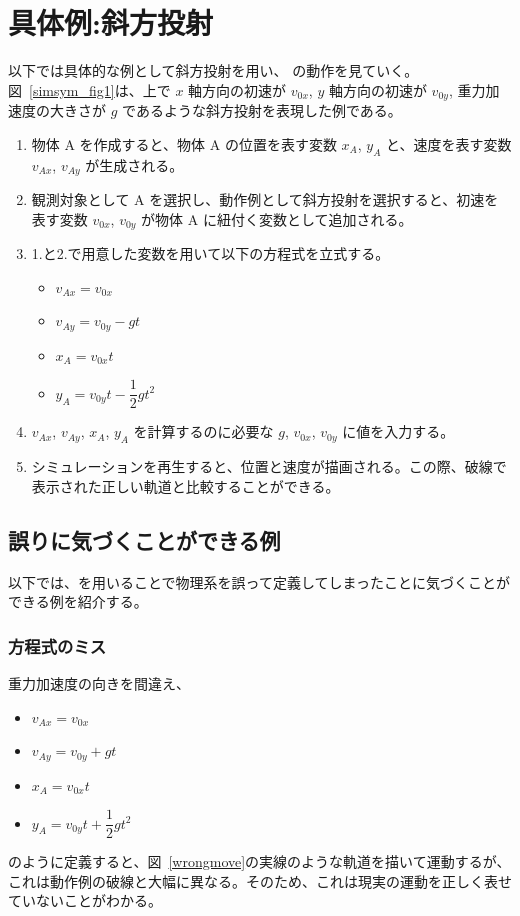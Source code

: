\section{具体例:斜方投射}
以下では具体的な例として斜方投射を用い、 \simname の動作を見ていく。
図~\ref{simsym_fig1}は、\simname 上で $x$ 軸方向の初速が $v_{0x}$, $y$ 軸方向の初速が $v_{0y}$, 重力加速度の大きさが $g$ であるような斜方投射を表現した例である。
\begin{enumerate}
\item 物体 A を作成すると、物体 A の位置を表す変数 $x_A$, $y_A$ と、速度を表す変数 $v_{Ax}$, $v_{Ay}$ が生成される。
\item 観測対象として A を選択し、動作例として斜方投射を選択すると、初速を表す変数 $v_{0x}$, $v_{0y}$ が物体 A に紐付く変数として追加される。
\item 1.と2.で用意した変数を用いて以下の方程式を立式する。
\begin{itemize}
  \item $v_{Ax} = v_{0x}$
  \item $v_{Ay} = v_{0y} - gt$
  \item $x_{A} = v_{0x}t$
  \item $y_{A} = v_{0y}t - \dfrac{1}{2}gt^2$
\end{itemize}
\item $v_{Ax}$, $v_{Ay}$, $x_A$, $y_A$ を計算するのに必要な $g$, $v_{0x}$, $v_{0y}$ に値を入力する。
\item シミュレーションを再生すると、位置と速度が描画される。この際、破線で表示された正しい軌道と比較することができる。
\end{enumerate}

\subsection{誤りに気づくことができる例}
以下では、\simname を用いることで物理系を誤って定義してしまったことに気づくことができる例を紹介する。

\subsubsection*{方程式のミス}
重力加速度の向きを間違え、
\begin{itemize}
  \item $v_{Ax} = v_{0x}$
  \item $v_{Ay} = v_{0y} + gt$
  \item $x_{A} = v_{0x}t$
  \item $y_A = v_{0y}t + \dfrac{1}{2}gt^2$
\end{itemize}
のように定義すると、図~\ref{wrongmove}の実線のような軌道を描いて運動するが、これは動作例の破線と大幅に異なる。そのため、これは現実の運動を正しく表せていないことがわかる。


